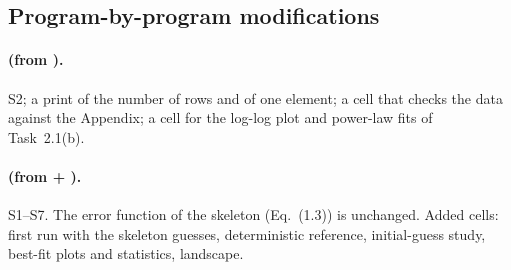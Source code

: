 \subsection{Program-by-program modifications}

\paragraph{ (from ).} S2; a print of the number of rows and of one
element; a cell that checks the data against the Appendix; a cell for the log-log plot and power-law
fits of Task~2.1(b).

\paragraph{ (from  + ).} S1--S7. The error
function of the skeleton (Eq.~(1.3)) is unchanged. Added cells: first run with the skeleton guesses,
deterministic reference, initial-guess study, best-fit plots and statistics, landscape.

